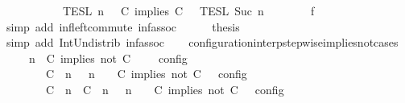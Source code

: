 \begin{isabellebody}
\ \ \ \ \ \ \ \ {\isasyminter}\ {\isacharparenleft}{\isasymlbrakk}{\isasymlbrakk}\ {\isasymPsi}\ {\isasymrbrakk}{\isasymrbrakk}\isactrlsub T\isactrlsub E\isactrlsub S\isactrlsub L\isactrlbsup {\isasymge}\ n\isactrlesup \ {\isasyminter}\ {\isasymlbrakk}{\isasymlbrakk}\ {\isacharparenleft}C\ implies\ C\ {\isacharhash}\ {\isasymPhi}\ {\isasymrbrakk}{\isasymrbrakk}\isactrlsub T\isactrlsub E\isactrlsub S\isactrlsub L\isactrlbsup {\isasymge}\ Suc\ n\isactrlesup {\isacharparenright}{\isacartoucheclose}\isanewline
\ \ \ \ \ \ \isamarkupfalse%
\ f{}\ \isamarkupfalse%
\ {\isacharparenleft}simp\ add{\isacharcolon}\ inf{\isacharunderscore}left{\isacharunderscore}commute\ inf{\isacharunderscore}assoc{\isacharparenright}\isanewline
\ \ \ \ \isamarkupfalse%
\ {\isacharquery}thesis\ \isamarkupfalse%
\ {\isacharparenleft}simp\ add{\isacharcolon}\ Int{\isacharunderscore}Un{\isacharunderscore}distrib{}\ inf{\isacharunderscore}assoc{\isacharparenright}\isanewline
\ \ \isamarkupfalse%
\isanewline
{}\isamarkupfalse%
%
\endisatagproof
{\isafoldproof}%
%
\isadelimproof
\isanewline
%
\endisadelimproof
\isanewline
{}\isamarkupfalse%
\ configuration{\isacharunderscore}interp{\isacharunderscore}stepwise{\isacharunderscore}implies{\isacharunderscore}not{\isacharunderscore}cases{\isacharcolon}\isanewline
\ \ \ {\isacartoucheopen}{\isasymlbrakk}\ {\isasymGamma}{\isacharcomma}\ n\ {\isasymTurnstile}\ {\isacharparenleft}{\isacharparenleft}C\ implies\ not\ C\ {\isacharhash}\ {\isasymPsi}{\isacharparenright}\ {\isasymtriangleright}\ {\isasymPhi}\ {\isasymrbrakk}\isactrlsub c\isactrlsub o\isactrlsub n\isactrlsub f\isactrlsub i\isactrlsub g\isanewline
\ \ \ \ \ \ {\isacharequal}\ {\isasymlbrakk}\ {\isacharparenleft}{\isacharparenleft}C\ {\isasymnot}{\isasymUp}\ n{\isacharparenright}\ {\isacharhash}\ {\isasymGamma}{\isacharparenright}{\isacharcomma}\ n\ {\isasymTurnstile}\ {\isasymPsi}\ {\isasymtriangleright}\ {\isacharparenleft}{\isacharparenleft}C\ implies\ not\ C\ {\isacharhash}\ {\isasymPhi}{\isacharparenright}\ {\isasymrbrakk}\isactrlsub c\isactrlsub o\isactrlsub n\isactrlsub f\isactrlsub i\isactrlsub g\isanewline
\ \ \ \ \ \ {\isasymunion}\ {\isasymlbrakk}\ {\isacharparenleft}{\isacharparenleft}C\ {\isasymUp}\ n{\isacharparenright}\ {\isacharhash}\ {\isacharparenleft}C\ {\isasymnot}{\isasymUp}\ n{\isacharparenright}\ {\isacharhash}\ {\isasymGamma}{\isacharparenright}{\isacharcomma}\ n\ {\isasymTurnstile}\ {\isasymPsi}\ {\isasymtriangleright}\ {\isacharparenleft}{\isacharparenleft}C\ implies\ not\ C\ {\isacharhash}\ {\isasymPhi}{\isacharparenright}\ {\isasymrbrakk}\isactrlsub c\isactrlsub o\isactrlsub n\isactrlsub f\isactrlsub i\isactrlsub g{\isacartoucheclose}\isanewline

\end{isabellebody}
